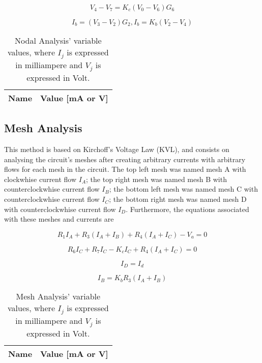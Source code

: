 \begin{equation}
  V_4 - V_7 = K_c(V_0 - V_6)G_6
  \label{eq:kvl7}
\end{equation}

\begin{equation}
  I_b = (V_3 - V_2)G_2 , I_b = K_b(V_2 - V_4)
  \label{eq:kvl8}
\end{equation}

\begin{table}[h]
  \centering
  \begin{tabular}{|l|r|}
    \hline    
    {\bf Name} & {\bf Value [mA or V]} \\ \hline
    
  \end{tabular}
  \caption{Nodal Analysis' variable values, where $I_j$ is expressed in milliampere and $V_j$ is expressed in Volt.}
  \label{tab:Nodal}
\end{table}
\FloatBarrier

\subsection{Mesh Analysis}

This method is based on Kirchoff's Voltage Law (KVL), and consists on analysing the circuit's meshes
after creating arbitrary currents with arbitrary flows for each mesh in the circuit. The top left mesh
was named mesh A with clockwhise current flow $I_A$; the top right mesh was named mesh B with counterclockwhise
current flow $I_B$; the bottom left mesh was named mesh C with counterclockwhise current flow $I_C$; the bottom right
mesh was named mesh D with counterclockwhise current flow $I_D$. Furthermore, the equations associated with these meshes
and currents are

\begin{equation}
  R_1 I_A + R_3(I_A + I_B) + R_4(I_A + I_C) - V_a = 0
  \label{eq:kvl}
\end{equation}

\begin{equation}
R_6 I_C + R_7 I_C - K_c I_C + R_4(I_A + I_C) = 0
  \label{eq:kvl2}
\end{equation}

\begin{equation}
  I_D = I_d
  \label{eq:kvl3}
\end{equation}

\begin{equation}
  I_B = K_b R_3(I_A + I_B)
  \label{eq:kvl4}
\end{equation}

\begin{table}[h]
  \centering
  \begin{tabular}{|l|r|}
    \hline    
    {\bf Name} & {\bf Value [mA or V]} \\ \hline
    
  \end{tabular}
  \caption{Mesh Analysis' variable values, where $I_j$ is expressed in milliampere and $V_j$ is expressed in Volt.}
  \label{tab:Mesh}
\end{table}
\FloatBarrier

